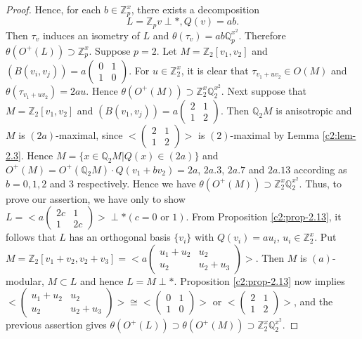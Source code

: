 \begin{proof}
Hence, for each $b\in\mathbb{Z}^{x}_{p}$, there exists a decomposition
$$
L=\mathbb{Z}_{p}v\perp\ast, Q(v)=ab.
$$
Then $\tau_{v}$ induces an isometry of $L$ and
$\theta(\tau_{v})=ab\mathbb{Q}^{x^{2}}_{p}$. Therefore\break
$\theta(O^{+}(L))\supset \mathbb{Z}^{x}_{p}$. Suppose $p=2$. Let
$M=\mathbb{Z}_{2}[v_{1},v_{2}]$ and
$(B(v_{i},v_{j}))=a\left(\begin{smallmatrix} 0 & 1\\ 1 & 0
\end{smallmatrix}\right)$. For $u\in\mathbb{Z}^{x}_{2}$, it is clear
that $\tau_{v_{1}+uv_{2}}\in O(M)$ and
$\theta(\tau_{v_{1}+uv_{2}})=2au$. Hence $\theta(O^{+}(M))\supset
\mathbb{Z}^{x}_{2}\mathbb{Q}^{x^{2}}_{2}$. Next suppose that
$M=\mathbb{Z}_{2}[v_{1},v_{2}]$ and
$(B(v_{1},v_{j}))=a\left(\begin{smallmatrix} 2 & 1\\ 1 & 2
\end{smallmatrix}\right)$. Then $\mathbb{Q}_{2}M$ is anisotropic and
$M$ is $(2a)$-maximal, since $<\left(\begin{smallmatrix} 2 & 1\\ 1 & 2
\end{smallmatrix}\right)>$ is $(2)$-maximal by Lemma \ref{c2:lem-2.3}. Hence
$M=\{x\in\mathbb{Q}_{2}M|Q(x)\in(2a)\}$ and
$O^{+}(M)=O^{+}(\mathbb{Q}_{2}M)\cdot Q(v_{1}+bv_{2})=2a$, $2a.3$,
$2a.7$ and $2a.13$ according as $b=0,1,2$ and $3$ respectively. Hence
we have $\theta(O^{+}(M))\supset
\mathbb{Z}^{x}_{2}\mathbb{Q}^{x^{2}}_{2}$. Thus, to prove our
assertion, we have only to show $L=<a\left(\begin{smallmatrix} 2c &
  1\\ 1 & 2c\end{smallmatrix}\right)>\perp \ast (c=0\text{ \ or
    \ }1)$. From Proposition \ref{c2:prop-2.13}, it follows that $L$ has
  an orthogonal basis $\{v_{i}\}$ with $Q(v_{i})=au_{i}$,
  $u_{i}\in\mathbb{Z}^{x}_{2}$. Put
  $M=\mathbb{Z}_{2}[v_{1}+v_{2},v_{2}+v_{3}]=<a\left(\begin{smallmatrix}
    u_{1}+u_{2} & u_{2}\\ u_{2} &
    u_{2}+u_{3}  \end{smallmatrix}\right) >$. Then $M$ is $(a)$-modular,
  $M\subset L$ and hence $L=M\perp \ast$. Proposition \ref{c2:prop-2.13}
  now implies $<\left(\begin{smallmatrix} u_{1}+u_{2} & u_{2}\\ u_{2}
    & u_{2}+u_{3}  \end{smallmatrix}\right)>\cong
  <\left(\begin{smallmatrix} 0 & 1\\ 1 & 0
  \end{smallmatrix}\right)>$ or $<\left(\begin{smallmatrix} 2 & 1\\ 1
    & 2  \end{smallmatrix}\right)>$, and the previous assertion gives
  $\theta(O^{+}(L))\supset \theta(O^{+}(M))\supset
  \mathbb{Z}^{x}_{2}\mathbb{Q}^{x^{2}}_{2}$. 
\end{proof}

